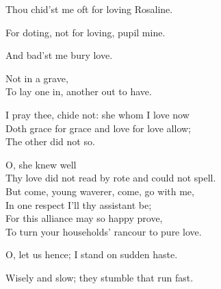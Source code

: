 \begin{speech}
Thou chid'st me oft for loving Rosaline. \\
\end{speech}
\begin{speech}
For doting, not for loving, pupil mine. \\
\end{speech}
\begin{speech}
And bad'st me bury love. \\
\end{speech}
\begin{speech}
Not in a grave, \\
To lay one in, another out to have. \\
\end{speech}
\begin{speech}
I pray thee, chide not: she whom I love now \\
Doth grace for grace and love for love allow; \\
The other did not so. \\
\end{speech}
\begin{speech}
O, she knew well \\
Thy love did not read by rote and could not spell. \\
But come, young waverer, come, go with me, \\
In one respect I'll thy assistant be; \\
For this alliance may so happy prove, \\
To turn your households' rancour to pure love. \\
\end{speech}
\begin{speech}
O, let us hence; I stand on sudden haste. \\
\end{speech}
\begin{speech}
Wisely and slow; they stumble that run fast.  \\
\end{speech}


